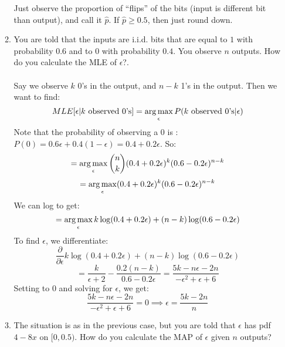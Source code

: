 \begin{enumerate}
\begin{enumerate}
        Just observe the proportion of ``flips'' of the bits (input is different bit than output), and call it $\hat{p}$. If $\hat{p} \geq 0.5$, then just round down.

      \item You are told that the inputs are i.i.d. bits that are equal to $1$ with probability $0.6$ and to $0$ with probability $0.4$. You observe $n$ outputs. How do you calculate the MLE of $\epsilon$?.\\\\

        Say we observe $k$ 0's in the output, and $n-k$ 1's in the output. Then we want to find:
        $$MLE[\epsilon | k \text{ observed 0's}] = \operatorname*{arg\,max}_{\epsilon} P(k \text{ observed 0's} | \epsilon)$$
        Note that the probability of observing a $0$ is : $P(0) = 0.6 \epsilon + 0.4(1 - \epsilon) = 0.4 + 0.2 \epsilon$. So:
        $$=\operatorname*{arg\,max}_{\epsilon} \binom{n}{k} (0.4 + 0.2 \epsilon)^k (0.6 - 0.2 \epsilon)^{n-k}$$
        $$=\operatorname*{arg\,max}_{\epsilon} (0.4 + 0.2 \epsilon)^k (0.6 - 0.2 \epsilon)^{n-k}$$
        We can log to get:
        $$=\operatorname*{arg\,max}_{\epsilon} k \log(0.4 + 0.2 \epsilon) + (n-k) \log(0.6 - 0.2 \epsilon)$$
        To find $\epsilon$, we differentiate:
        $$\frac{\partial}{\partial \epsilon} k \log(0.4 + 0.2 \epsilon) + (n-k) \log(0.6 - 0.2 \epsilon)$$
        $$=\frac{k}{\epsilon + 2} - \frac{0.2(n-k)}{0.6 - 0.2 \epsilon} = \frac{5k - n \epsilon - 2n}{- \epsilon^2 + \epsilon + 6}$$
        Setting to $0$ and solving for $\epsilon$, we get:
        $$\frac{5k - n \epsilon - 2n}{- \epsilon^2 + \epsilon + 6} = 0 \implies \epsilon = \frac{5k-2n}{n}$$

      \item The situation is as in the previous case, but you are told that $\epsilon$ has pdf $4 - 8x$ on $[0,0.5)$. How do you calculate the MAP of $\epsilon$ given $n$ outputs?\\\\


\end{enumerate}
\end{enumerate}
